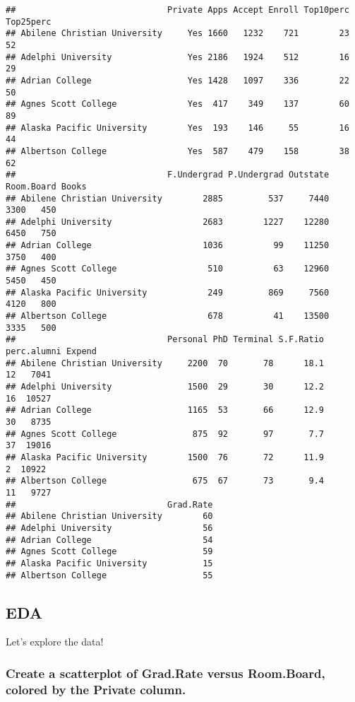 \documentclass[]{article}
\begin{document}
\begin{verbatim}
##                              Private Apps Accept Enroll Top10perc Top25perc
## Abilene Christian University     Yes 1660   1232    721        23        52
## Adelphi University               Yes 2186   1924    512        16        29
## Adrian College                   Yes 1428   1097    336        22        50
## Agnes Scott College              Yes  417    349    137        60        89
## Alaska Pacific University        Yes  193    146     55        16        44
## Albertson College                Yes  587    479    158        38        62
##                              F.Undergrad P.Undergrad Outstate Room.Board Books
## Abilene Christian University        2885         537     7440       3300   450
## Adelphi University                  2683        1227    12280       6450   750
## Adrian College                      1036          99    11250       3750   400
## Agnes Scott College                  510          63    12960       5450   450
## Alaska Pacific University            249         869     7560       4120   800
## Albertson College                    678          41    13500       3335   500
##                              Personal PhD Terminal S.F.Ratio perc.alumni Expend
## Abilene Christian University     2200  70       78      18.1          12   7041
## Adelphi University               1500  29       30      12.2          16  10527
## Adrian College                   1165  53       66      12.9          30   8735
## Agnes Scott College               875  92       97       7.7          37  19016
## Alaska Pacific University        1500  76       72      11.9           2  10922
## Albertson College                 675  67       73       9.4          11   9727
##                              Grad.Rate
## Abilene Christian University        60
## Adelphi University                  56
## Adrian College                      54
## Agnes Scott College                 59
## Alaska Pacific University           15
## Albertson College                   55
\end{verbatim}

\hypertarget{eda}{%
\subsection{EDA}\label{eda}}

Let's explore the data!

\hypertarget{create-a-scatterplot-of-grad.rate-versus-room.board-colored-by-the-private-column.}{%
\subsubsection{Create a scatterplot of Grad.Rate versus Room.Board,
colored by the Private
column.}\label{create-a-scatterplot-of-grad.rate-versus-room.board-colored-by-the-private-column.}}
\end{document}
